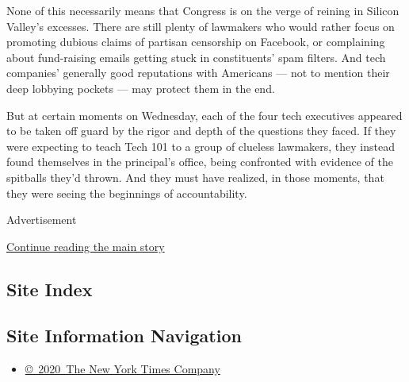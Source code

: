 None of this necessarily means that Congress is on the verge of reining
in Silicon Valley's excesses. There are still plenty of lawmakers who
would rather focus on promoting dubious claims of partisan censorship on
Facebook, or complaining about fund-raising emails getting stuck in
constituents' spam filters. And tech companies' generally good
reputations with Americans --- not to mention their deep lobbying
pockets --- may protect them in the end.

But at certain moments on Wednesday, each of the four tech executives
appeared to be taken off guard by the rigor and depth of the questions
they faced. If they were expecting to teach Tech 101 to a group of
clueless lawmakers, they instead found themselves in the principal's
office, being confronted with evidence of the spitballs they'd thrown.
And they must have realized, in those moments, that they were seeing the
beginnings of accountability.

Advertisement

\protect\hyperlink{after-bottom}{Continue reading the main story}

\hypertarget{site-index}{%
\subsection{Site Index}\label{site-index}}

\hypertarget{site-information-navigation}{%
\subsection{Site Information
Navigation}\label{site-information-navigation}}

\begin{itemize}
\tightlist
\item
  \href{https://help.nytimes3xbfgragh.onion/hc/en-us/articles/115014792127-Copyright-notice}{©~2020~The
  New York Times Company}
\end{itemize}

